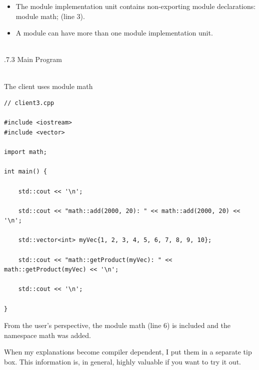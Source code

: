 \begin{itemize}
\item 
The module implementation unit contains non-exporting module declarations: module math; (line 3).

\item 
A module can have more than one module implementation unit.
\end{itemize}

\hspace*{\fill} \\ %
.7.3\hspace{0.2cm} Main Program

\hspace*{\fill} \\ %
\noindent
The client uses module math
\begin{lstlisting}[style=styleCXX]
// client3.cpp

#include <iostream>
#include <vector>

import math;

int main() {

	std::cout << '\n';
	
	std::cout << "math::add(2000, 20): " << math::add(2000, 20) << '\n';
	
	std::vector<int> myVec{1, 2, 3, 4, 5, 6, 7, 8, 9, 10};
	
	std::cout << "math::getProduct(myVec): " << math::getProduct(myVec) << '\n';
	
	std::cout << '\n';

}
\end{lstlisting}

From the user’s perspective, the module math (line 6) is included and the namespace math was added.

When my explanations become compiler dependent, I put them in a separate tip box. This information is, in general, highly valuable if you want to try it out.


